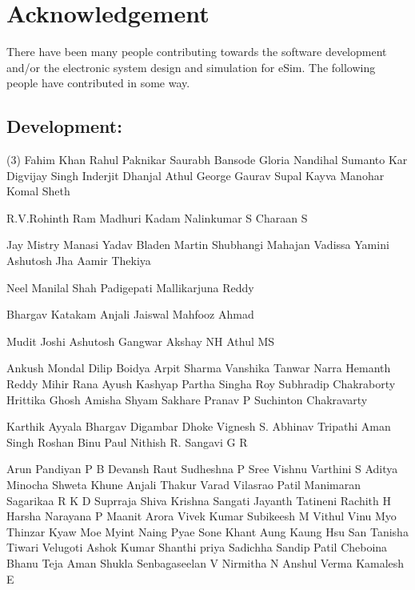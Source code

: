 \section*{Acknowledgement}

There  have  been  many  people contributing towards the software development and/or the electronic system design and simulation for eSim. The following people have contributed in some way.

\subsection*{Development:}
\begin{tasks}[style=itemize](3)
    \task Fahim Khan
    \task Rahul Paknikar
    \task Saurabh Bansode
    \task Gloria Nandihal
    \task Sumanto Kar
    \task Digvijay Singh
    \task Inderjit Dhanjal
    \task Athul George
    \task Gaurav Supal
    \task Kayva Manohar
    \task Komal Sheth


    \task R.V.Rohinth Ram
    \task Madhuri Kadam
    \task Nalinkumar S
    \task Charaan S


    \task Jay Mistry
    \task Manasi Yadav
    \task Bladen Martin
    \task Shubhangi Mahajan
    \task Vadissa Yamini
    \task Ashutosh Jha
    \task Aamir Thekiya

    \task Neel Manilal Shah
    \task Padigepati Mallikarjuna Reddy
    
    \vspace{-1mm}
    
    \task Bhargav Katakam
    \task Anjali Jaiswal
    \task Mahfooz Ahmad

    \task Mudit Joshi
    \task Ashutosh Gangwar
    \task Akshay NH
    \task Athul MS

    \task Ankush Mondal
    \task Dilip Boidya
    \task Arpit Sharma
    \task Vanshika Tanwar
    \task Narra Hemanth Reddy
    \task Mihir Rana
    \task Ayush Kashyap
    \task Partha Singha Roy
    \task Subhradip Chakraborty
    \task Hrittika Ghosh
    \task Amisha Shyam Sakhare
    \task Pranav P
    \task Suchinton Chakravarty
    
    \task Karthik Ayyala
    \task Bhargav Digambar Dhoke
    \task Vignesh S.
    \task Abhinav Tripathi
    \task Aman Singh
    \task Roshan Binu Paul
    \task Nithish R.
    \task Sangavi G R 

    \task Arun Pandiyan P B
    \task Devansh Raut
    \task Sudheshna P
\task Sree Vishnu Varthini S
\task Aditya Minocha
\task Shweta Khune
\task Anjali  Thakur
\task Varad Vilasrao Patil
\task Manimaran
\task Sagarikaa R K
\task D Suprraja
\task Shiva Krishna Sangati
\task Jayanth Tatineni
\task Rachith H
\task Harsha Narayana P
\task Maanit Arora
\task Vivek Kumar
\task Subikeesh M
\task Vithul Vinu
     \task Myo Thinzar Kyaw
     \task Moe Myint Naing
     \task Pyae Sone Khant Aung
     \task Kaung Hsu San
     \task Tanisha Tiwari
     \task Velugoti Ashok Kumar
     \task Shanthi priya
     \task Sadichha Sandip Patil
     \task Cheboina Bhanu Teja
     \task Aman Shukla
     \task Senbagaseelan V
     \task Nirmitha N
     \task Anshul Verma
     \task Kamalesh E
    

\end{tasks}
